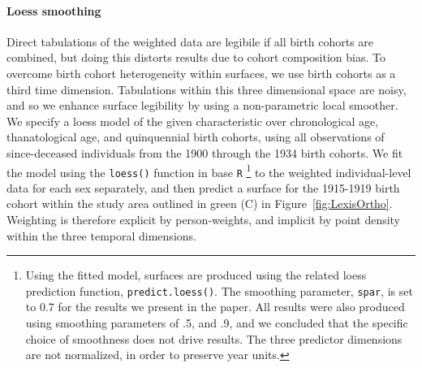 \documentclass{article}
\begin{document}
\paragraph*{Loess smoothing}
Direct tabulations of the weighted data are legibile if all birth
cohorts are combined, but doing this distorts results due to cohort
composition bias. To overcome birth cohort heterogeneity within surfaces,
we use birth cohorts as a third time dimension. Tabulations within this three dimensional space are noisy, and so we
enhance surface legibility by using a non-parametric local smoother.
We specify a loess model of the given characteristic over chronological age,
thanatological age, and quinquennial birth cohorts, using all observations of since-deceased individuals from the 1900 through the 1934 birth cohorts. We fit the model using the \texttt{loess()} function in base \texttt{R} \citep{cleveland1992local,Rcore2013}\footnote{Using the fitted model, surfaces are produced using the related loess prediction function, \texttt{predict.loess()}. The smoothing parameter, \texttt{spar}, is set to 0.7 for the results we present in the paper.
All results were also produced using smoothing parameters of .5, and .9, and
we concluded that the specific choice of smoothness does not drive results.
The three predictor dimensions are not normalized, in order to preserve year
units. } to the weighted individual-level data for each sex separately, and then
predict a surface for the 1915-1919 birth cohort within the study area outlined
in green (C) in Figure~\ref{fig:LexisOrtho}. Weighting is therefore explicit by
person-weights, and implicit by point density within the three temporal
dimensions.



\end{document}
